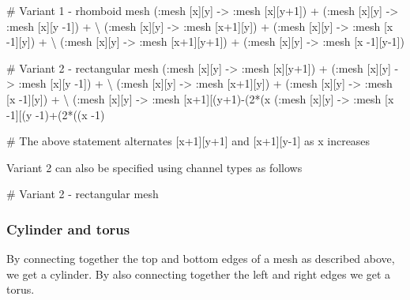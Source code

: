 \begin{kappasource}

# Variant 1 - rhomboid mesh
    (:mesh [x][y] -> :mesh [x][y+1]) + (:mesh [x][y] -> :mesh [x][y -1]) + {\textbackslash}
    (:mesh [x][y] -> :mesh [x+1][y]) + (:mesh [x][y] -> :mesh [x -1][y]) + {\textbackslash}
    (:mesh [x][y] -> :mesh [x+1][y+1]) + (:mesh [x][y] -> :mesh [x -1][y-1])

# Variant 2 - rectangular mesh
    (:mesh [x][y] -> :mesh [x][y+1]) + (:mesh [x][y] -> :mesh [x][y -1]) + {\textbackslash}
    (:mesh [x][y] -> :mesh [x+1][y]) + (:mesh [x][y] -> :mesh [x -1][y]) + {\textbackslash}
    (:mesh [x][y] -> :mesh [x+1][(y+1)-(2*(x%
    (:mesh [x][y] -> :mesh [x -1][(y -1)+(2*((x -1)%

# The above statement alternates [x+1][y+1] and [x+1][y-1] as x increases
\end{kappasource}

Variant 2 can also be specified using channel types as follows

\begin{kappasource}

# Variant 2 - rectangular mesh
\end{kappasource}


\subsubsection{Cylinder and torus}

By connecting together the top and bottom edges of a mesh as described above, we get a cylinder. By also connecting together the left and right edges we get a torus.

